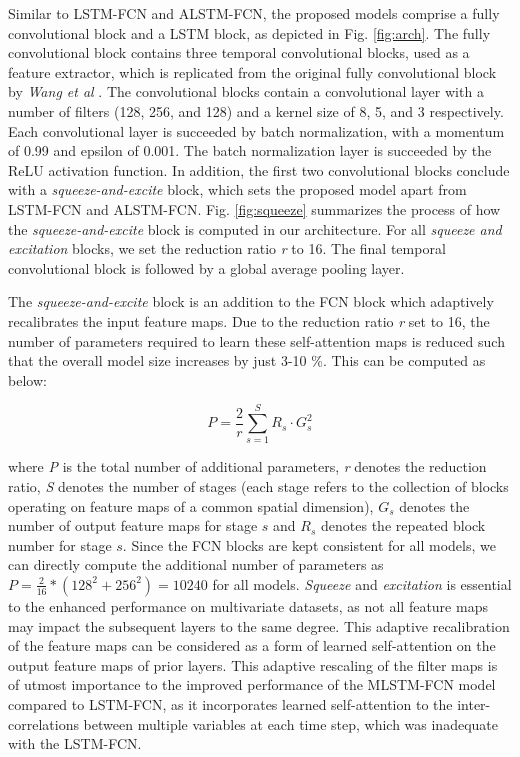 \documentclass[preprint,12pt,3p]{elsarticle}
\begin{document}
Similar to LSTM-FCN and ALSTM-FCN, the proposed models comprise a fully convolutional block and a LSTM block, as depicted in Fig. \ref{fig:arch}. The fully convolutional block contains three temporal convolutional blocks, used as a feature extractor, which is replicated from the original fully convolutional block by \textit{Wang et al} \cite{wang2017time}. The convolutional blocks contain a convolutional layer with a number of filters (128, 256, and 128) and a kernel size of 8, 5, and 3 respectively. Each convolutional layer is succeeded by batch normalization, with a momentum of 0.99 and epsilon of 0.001. The batch normalization layer is succeeded by the ReLU activation function. In addition, the first two convolutional blocks conclude with a \textit{squeeze-and-excite} block, which sets the proposed model apart from LSTM-FCN and ALSTM-FCN. Fig. \ref{fig:squeeze} summarizes the process of how the \textit{squeeze-and-excite} block is computed in our architecture.  For all \textit{squeeze and excitation} blocks, we set the reduction ratio \textit{r} to 16. The final temporal convolutional block is followed by a global average pooling layer. 

The \textit{squeeze-and-excite} block is an addition to the FCN block which adaptively recalibrates the input feature maps. Due to the reduction ratio \textit{r} set to 16, the number of parameters required to learn these self-attention maps is reduced such that the overall model size increases by just 3-10 \%. This can be computed as below:
 
\begin{equation*}
    P = \frac{2}{r} \sum_{s=1}^S R_s \cdot G_s^2
\end{equation*}
 
where \textit{P} is the total number of additional parameters, \textit{r} denotes the reduction ratio, \textit{S} denotes the number of stages (each stage refers to the collection of blocks operating on feature maps of a common spatial dimension), $G_s$ denotes the number of output feature maps for stage $s$ and $R_s$ denotes the repeated block number for stage $s$. Since the FCN blocks are kept consistent for all models, we can directly compute the additional number of parameters as $P = \frac{2}{16} * (128^2 + 256^2) = 10240$ for all models. \textit{Squeeze} and \textit{excitation} is essential to the enhanced performance on multivariate datasets, as not all feature maps may impact the subsequent layers to the same degree. This adaptive recalibration of the feature maps can be considered as a form of learned self-attention on the output feature maps of prior layers. This adaptive rescaling of the filter maps is of utmost importance to the improved performance of the MLSTM-FCN model compared to LSTM-FCN, as it incorporates learned self-attention to the inter-correlations between multiple variables at each time step, which was inadequate with the LSTM-FCN.
\end{document}
